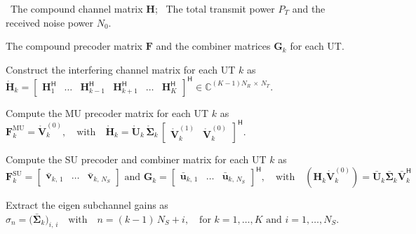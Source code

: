 \begin{algorithm}[b!]
\caption{\ac{BD} Precoding}
\label{alg:bd_precoding}
\begin{algorithmic}[1]
    
    \Require 
    \Statex \hspace{-\algorithmicindent} \textbullet \, The compound channel matrix $\mathbf{H}$;
    \Statex \hspace{-\algorithmicindent} \textbullet \, The total transmit power $P_T$ and the received noise power $N_0$.
    
    \Ensure  The compound precoder matrix $\mathbf{F}$ and the combiner matrices $\mathbf{G}_k$ for each \ac{UT}.

    \medskip
    \State Construct the interfering channel matrix for each \ac{UT} $k$ as
    \Statex $\mathring{\mathbf{H}}_k = \begin{bmatrix} \mathbf{H}_1^{\mathsf{H}} & \dots & \mathbf{H}_{k-1}^{\mathsf{H}} & \mathbf{H}_{k+1}^{\mathsf{H}} & \dots & \mathbf{H}_K^{\mathsf{H}} \end{bmatrix}^{\mathsf{H}} \in \mathbb{C}^{(K-1)N_R \, \times \, N_T}.$
    
    \vspace{0.4\baselineskip}
    \State Compute the \ac{MU} precoder matrix for each \ac{UT} $k$ as
    \Statex $\mathbf{F}_k^{\mathrm{MU}} = \mathring{\mathbf{V}}_{k}^{(0)}, \quad \text{with} \quad \mathring{\mathbf{H}}_k  = \mathring{\mathbf{U}}_k \, \mathring{\boldsymbol{\Sigma}}_k \, \begin{bmatrix} \mathring{\mathbf{V}}_{k}^{(1)} & \mathring{\mathbf{V}}_{k}^{(0)} \end{bmatrix}^{\mathsf{H}}.$

    \vspace{0.4\baselineskip}
    \State Compute the \ac{SU} precoder and combiner matrix for each \ac{UT} $k$ as
    \Statex $\mathbf{F}_k^{\mathrm{SU}} = \begin{bmatrix} \bar{\mathbf{v}}_{k, \, 1} & \dots & \bar{\mathbf{v}}_{k, \, N_S} \end{bmatrix} \text{  and  } \mathbf{G}_k = \begin{bmatrix} \bar{\mathbf{u}}_{k, \, 1} & \dots & \bar{\mathbf{u}}_{k, \, N_S} \end{bmatrix}^{\mathsf{H}},  \quad \text{with} \quad (\mathbf{H}_k \mathring{\mathbf{V}}_{k}^{(0)}) = \bar{\mathbf{U}}_k \bar{\mathbf{\Sigma}}_k \bar{\mathbf{V}}_k^{\mathsf{H}}$

    \vspace{0.4\baselineskip}
    \State Extract the eigen subchannel gains as
    \Statex $\sigma_n = \big(\bar{\mathbf{\Sigma}}_k\big)_{i,\,i} \quad \text{with} \quad n = (k-1)\,N_S + i, \quad \text{for  } k = 1, \dots, K \text{  and  } i = 1, \dots, N_S.$


\end{algorithmic}
\end{algorithm}
